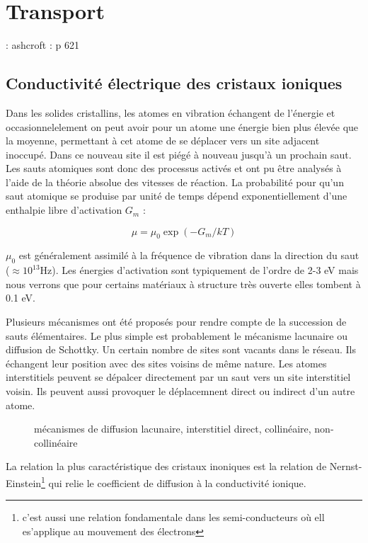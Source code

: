 \chapter{Transport}

\TODO : ashcroft : p 621

\section{Conductivité électrique des cristaux ioniques}

Dans les solides cristallins, les atomes en vibration échangent de l'énergie et occasionnelelement on peut avoir pour un atome une énergie bien plus élevée que la moyenne, permettant à cet atome de se déplacer vers un site adjacent inoccupé. Dans ce nouveau site il est piégé à nouveau jusqu'à un prochain saut. Les sauts atomiques sont donc des processus activés et ont pu être analysés à l'aide de la théorie absolue des vitesses de réaction. La probabilité pour qu'un saut atomique se produise par unité de temps dépend exponentiellement d'une enthalpie libre d'activation $G_m$ :

\begin{equation}
\mu = \mu_0 \exp (-G_m / kT)
\end{equation}

$\mu_0$ est généralement assimilé à la fréquence de vibration dans la direction du saut ($\approx 10^{13}$Hz). Les énergies d'activation sont typiquement de l'ordre de 2-3 eV mais nous verrons que pour certains matériaux à structure très ouverte elles tombent à 0.1 eV.

Plusieurs mécanismes ont été proposés pour rendre compte de la succession de sauts élémentaires. Le plus simple est probablement le mécanisme lacunaire ou diffusion de Schottky. Un certain nombre de sites sont vacants dans le réseau. Ils échangent leur position avec des sites voisins de même nature. Les atomes interstitiels peuvent se dépalcer directement par un saut vers un site interstitiel voisin. Ils peuvent aussi provoquer le déplacemnent direct ou indirect d'un autre atome.

\begin{figure}
\TODO
\caption{mécanismes de diffusion lacunaire, interstitiel direct, collinéaire, non-collinéaire}
\label{mecanismestransport}
\end{figure}

La relation la plus caractéristique des cristaux inoniques est la relation de Nernst-Einstein\footnote{c'est aussi une relation fondamentale dans les semi-conducteurs où ell es'applique au mouvement des électrons} qui relie le coefficient de diffusion à la conductivité ionique.

